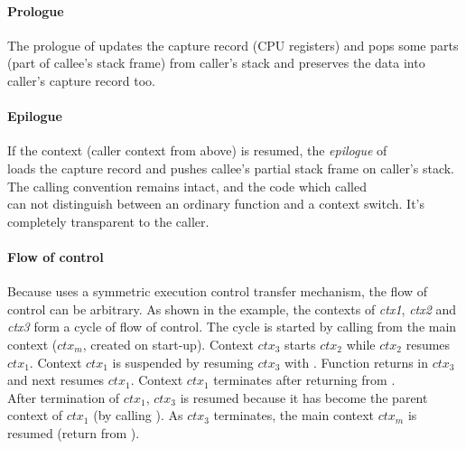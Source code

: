 \paragraph*{Prologue}
The prologue of \ectxop updates the capture record (CPU registers) and pops
some parts (part of callee's stack frame) from caller's stack and preserves the
data into caller's capture record too.

\paragraph*{Epilogue}
If the context (caller context from above) is resumed, the \emph{epilogue} of\\
\ectxop loads the capture record and pushes callee's partial stack frame on
caller's stack. The calling convention remains intact, and the code which
called\\
\ectxop can not distinguish between an ordinary function and a context switch.
It's completely transparent to the caller.

\paragraph*{Flow of control}
Because \ectx uses a symmetric execution control transfer mechanism, the flow
of control can be arbitrary.
As shown in the example, the contexts of \emph{ctx1}, \emph{ctx2} and
\emph{ctx3} form a cycle of flow of control.
The cycle is started by calling  from the main context
(\emph{$ctx_m$}, created on start-up). Context \emph{$ctx_3$} starts
\emph{$ctx_2$} while \emph{$ctx_2$} resumes \emph{$ctx_1$}. Context
\emph{$ctx_1$} is suspended by resuming \emph{$ctx_3$} with .
Function  returns in \emph{$ctx_3$} and  next resumes
\emph{$ctx_1$}. Context \emph{$ctx_1$} terminates after returning from
.\\
After termination of \emph{$ctx_1$}, \emph{$ctx_3$} is resumed because it has
become the parent context of \emph{$ctx_1$} (by calling ). As
\emph{$ctx_3$} terminates, the main context \emph{$ctx_m$} is resumed (return
from ).

